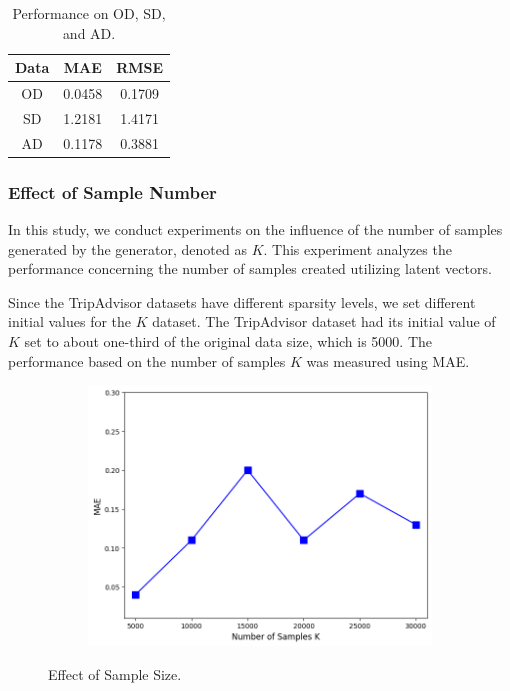 \documentclass[]{article}
\begin{document}
\begin{table}[!htbp]
	\centering
	\setlength{\tabcolsep}{12pt}
	\renewcommand{\arraystretch}{1.4}
	\caption{Performance on OD, SD, and AD.}
	\label{sec6:results4}
	\begin{tabular}{ccc}
		\toprule
		Data & MAE    & RMSE   \\
		\midrule
		OD   & 0.0458 &  0.1709 \\
		SD   & 1.2181 & 1.4171 \\
		AD   & 0.1178 & 0.3881 \\
		\bottomrule
	\end{tabular}
\end{table}

\subsubsection{Effect of Sample Number}
In this study, we conduct experiments on the influence of the number of samples generated by the generator, denoted as $K$. This experiment analyzes the performance concerning the number of samples created utilizing latent vectors.

Since the TripAdvisor datasets have different sparsity levels, we set different initial values for the $K$ dataset. The TripAdvisor dataset had its initial value of $K$ set to about one-third of the original data size, which is 5000. The performance based on the number of samples $K$ was measured using MAE.
\begin{figure}[!htbp]
	\centering
	\begin{subfigure}[b]{0.495\textwidth}
		\centering
		\includegraphics[width=\textwidth]{fig/Tripadvisor_K.png}
		\label{fig5:image1}
	\end{subfigure}
	\hfill
	\caption{Effect of Sample Size.}
	\label{fig5}
\end{figure}
\end{document}
